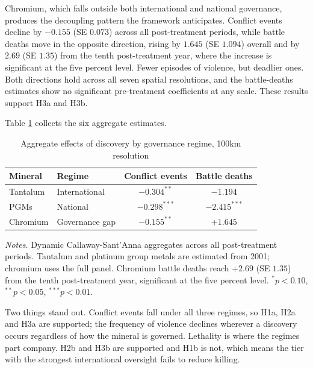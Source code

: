 \documentclass[11pt]{article}
\begin{document}
Chromium, which falls outside both international and national governance, produces the decoupling pattern the framework anticipates. Conflict events decline by $-0.155$ (SE $0.073$) across all post-treatment periods, while battle deaths move in the opposite direction, rising by $1.645$ (SE $1.094$) overall and by $2.69$ (SE $1.35$) from the tenth post-treatment year, where the increase is significant at the five percent level. Fewer episodes of violence, but deadlier ones. Both directions hold across all seven spatial resolutions, and the battle-deaths estimates show no significant pre-treatment coefficients at any scale. These results support H3a and H3b.

Table \ref{tab:regime_summary} collects the six aggregate estimates.

\begin{table}[H]
\centering
\caption{Aggregate effects of discovery by governance regime, 100km resolution}
\label{tab:regime_summary}
\begin{tabular}{llcc}
\toprule
\textbf{Mineral} & \textbf{Regime} & \textbf{Conflict events} & \textbf{Battle deaths} \\
\midrule
Tantalum & International   & $-0.304^{**}$  & $-1.194$ \\
PGMs     & National        & $-0.298^{***}$ & $-2.415^{***}$ \\
Chromium & Governance gap  & $-0.155^{**}$  & $+1.645$ \\
\bottomrule
\end{tabular}
\begin{minipage}{0.86\textwidth}\vspace{4pt}\scriptsize \textit{Notes.} Dynamic Callaway-Sant'Anna aggregates across all post-treatment periods. Tantalum and platinum group metals are estimated from 2001; chromium uses the full panel. Chromium battle deaths reach $+2.69$ (SE $1.35$) from the tenth post-treatment year, significant at the five percent level. $^{*}p<0.10$, $^{**}p<0.05$, $^{***}p<0.01$.\end{minipage}
\end{table}

Two things stand out. Conflict events fall under all three regimes, so H1a, H2a and H3a are supported; the frequency of violence declines wherever a discovery occurs regardless of how the mineral is governed. Lethality is where the regimes part company. H2b and H3b are supported and H1b is not, which means the tier with the strongest international oversight fails to reduce killing.
\end{document}

